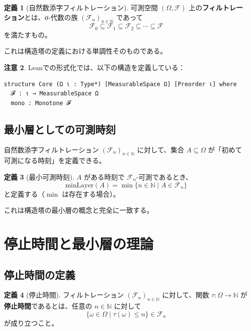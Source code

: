 \documentclass[a4paper,12pt]{article}
\theoremstyle{definition}
\newtheorem{definition}{定義}[section]
\newtheorem{remark}[definition]{注意}
\begin{document}
\begin{definition}[自然数添字フィルトレーション]
可測空間 $(\Omega, \mathcal{F})$ 上の\textbf{フィルトレーション}とは、σ-代数の族 $(\mathcal{F}_n)_{n \in \mathbb{N}}$ であって
\[
\mathcal{F}_0 \subseteq \mathcal{F}_1 \subseteq \mathcal{F}_2 \subseteq \cdots \subseteq \mathcal{F}
\]
を満たすもの。
\end{definition}

これは構造塔の定義における単調性そのものである。

\begin{remark}
Leanでの形式化では、以下の構造を定義している：
\begin{verbatim}
structure Core (Ω ι : Type*) [MeasurableSpace Ω] [Preorder ι] where
  𝓕 : ι → MeasurableSpace Ω
  mono : Monotone 𝓕
\end{verbatim}
\end{remark}

\subsection{最小層としての可測時刻}

自然数添字フィルトレーション $(\mathcal{F}_n)_{n \in \mathbb{N}}$ に対して、集合 $A \subseteq \Omega$ が「初めて可測になる時刻」を定義できる。

\begin{definition}[最小可測時刻]
$A$ がある時刻で $\mathcal{F}_n$-可測であるとき、
\[
\text{minLayer}(A) = \min\{n \in \mathbb{N} \mid A \in \mathcal{F}_n\}
\]
と定義する（$\min$ は存在する場合）。
\end{definition}

これは構造塔の最小層の概念と完全に一致する。

\section{停止時間と最小層の理論}

\subsection{停止時間の定義}

\begin{definition}[停止時間]
フィルトレーション $(\mathcal{F}_n)_{n \in \mathbb{N}}$ に対して、関数 $\tau : \Omega \to \mathbb{N}$ が\textbf{停止時間}であるとは、任意の $n \in \mathbb{N}$ に対して
\[
\{\omega \in \Omega \mid \tau(\omega) \leq n\} \in \mathcal{F}_n
\]
が成り立つこと。
\end{definition}
\end{document}
